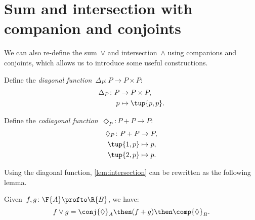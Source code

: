 \section{Sum and intersection with companion and conjoints}

We can also re-define the sum~$\vee$ and intersection~$\wedge$ using companions and conjoints, which allows us to introduce some useful constructions.

\begin{definition}
    Define the \emph{diagonal function}~$\Delta_P\colon P \to P \times P$:
    \begin{equation}
        \begin{aligned}
            \Delta_P \colon P & \to P \times P, \\
            p & \mapsto \tup{p, p}.
        \end{aligned}
    \end{equation}
\end{definition}

\begin{definition}
    Define the \emph{codiagonal function}~$\Diamond_P\colon P+P \to P $:
    \begin{equation}
        \begin{aligned}
            \Diamond_P \colon P + P & \to P,  \\
            \tup{1,p} & \mapsto p, \\
            \tup{2,p} & \mapsto p.
        \end{aligned}
    \end{equation}
\end{definition}

\noindent Using the diagonal function, \cref{lem:intersection} can be rewritten as the following lemma.

\begin{lemma}
    Given~$f, g\colon \F{A} \profto \R{B}$, we have:
    \begin{equation}
        f \vee g =  \conj{\Diamond}_A \then (f + g)\then \comp{\Diamond}_B.
    \end{equation}
\end{lemma}

